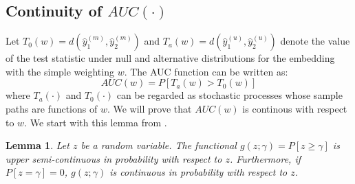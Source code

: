 \documentclass[12pt]{article} %
\newtheorem{lem}{Lemma}
\begin{document}
 
\subsection{Continuity of $AUC(\cdot)$} 
 Let $T_0(w)=d(\hat{y}_{1}^{{(m)}},\hat{y}_{2}^{{(m)}})$ and $T_a(w)=d(\hat{y}_{1}^{(u)},\hat{y}_{2}^{(u)})$ denote the value of the test statistic under null and alternative distributions  for the embedding with the simple weighting $w$.  %
The AUC function can be written as: $$AUC(w)=P\left[T_a(w)>T_0(w)\right]$$ where $T_a(\cdot)$ and $T_0(\cdot)$  can be regarded as  stochastic processes whose sample paths are functions  of $w$.  We will prove that $AUC(w)$ is continous with respect to $w$.
We start with this lemma from \cite{Raik1972}.

\begin{lem}
Let $z$ be a random variable. The functional $g(z;\gamma) = P\left[z \geq \gamma \right]$ is upper semi-continuous in probability with respect to $z$. Furthermore, if $P\left[z = \gamma \right]=0$, $g(z;\gamma)$ is continuous in probability with respect to $z$. \label{lemma_1}
\end{lem}
\end{document}
